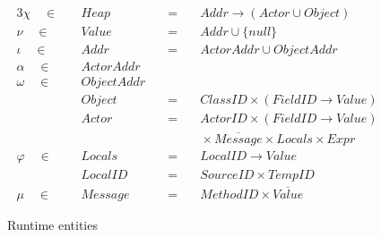 \documentclass[format=acmsmall, authordraft, authorversion]{acmart}\settopmatter{printfolios=true,printccs=false,printacmref=false}
\newcommand{\seq}[1]{\overline{#1}}
\begin{document}
\begin{figure}[ht!]
\centering
\begin{alignat*}{3}
    \chi    \quad\in\quad& \mathit{Heap}       \quad&=&\quad \mathit{Addr}\rightarrow(\mathit{Actor}\cup\mathit{Object})\\
    \nu     \quad\in\quad& \mathit{Value}      \quad&=&\quad \mathit{Addr}\cup\{\mathit{null}\}\\
    \iota   \quad\in\quad& \mathit{Addr}       \quad&=&\quad \mathit{ActorAddr} \cup \mathit{ObjectAddr}\\
    \alpha  \quad\in\quad& \mathit{ActorAddr}  \quad\\
    \omega  \quad\in\quad& \mathit{ObjectAddr} \quad\\
                         & \mathit{Object}     \quad&=&\quad \mathit{ClassID}\times(\mathit{FieldID}\rightarrow\mathit{Value})\\
                         & \mathit{Actor}      \quad&=&\quad \mathit{ActorID}\times(\mathit{FieldID}\rightarrow\mathit{Value})\\
                         &                     \quad& &\quad \times\seq{\mathit{Message}}\times\mathit{Locals}\times\mathit{Expr}\\
    \varphi \quad\in\quad& \mathit{Locals}     \quad&=&\quad \mathit{LocalID}\rightarrow\mathit{Value}\\
                         & \mathit{LocalID}    \quad&=&\quad \mathit{SourceID}\times\mathit{TempID}\\
    \mu     \quad\in\quad& \mathit{Message}    \quad&=&\quad \mathit{MethodID}\times\seq{\mathit{Value}}
\end{alignat*}
\caption{Runtime entities}
\end{figure}
\end{document}
